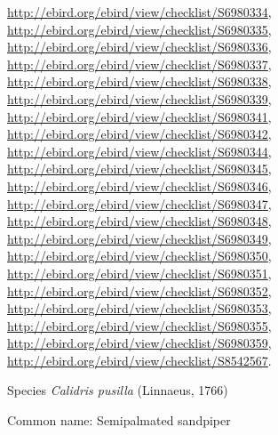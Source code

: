 \documentclass[9pt, article]{memoir}
\begin{document}
\begin{multicols}{2}
\url{http://ebird.org/ebird/view/checklist/S6980334}, 
\url{http://ebird.org/ebird/view/checklist/S6980335}, 
\url{http://ebird.org/ebird/view/checklist/S6980336}, 
\url{http://ebird.org/ebird/view/checklist/S6980337}, 
\url{http://ebird.org/ebird/view/checklist/S6980338}, 
\url{http://ebird.org/ebird/view/checklist/S6980339}, 
\url{http://ebird.org/ebird/view/checklist/S6980341}, 
\url{http://ebird.org/ebird/view/checklist/S6980342}, 
\url{http://ebird.org/ebird/view/checklist/S6980344}, 
\url{http://ebird.org/ebird/view/checklist/S6980345}, 
\url{http://ebird.org/ebird/view/checklist/S6980346}, 
\url{http://ebird.org/ebird/view/checklist/S6980347}, 
\url{http://ebird.org/ebird/view/checklist/S6980348}, 
\url{http://ebird.org/ebird/view/checklist/S6980349}, 
\url{http://ebird.org/ebird/view/checklist/S6980350}, 
\url{http://ebird.org/ebird/view/checklist/S6980351}, 
\url{http://ebird.org/ebird/view/checklist/S6980352}, 
\url{http://ebird.org/ebird/view/checklist/S6980353}, 
\url{http://ebird.org/ebird/view/checklist/S6980355}, 
\url{http://ebird.org/ebird/view/checklist/S6980359}, 
\url{http://ebird.org/ebird/view/checklist/S8542567}.

\vspace{6pt}\noindent\hspace{36pt}Species \textit{Calidris pusilla} (Linnaeus, 1766)


Common name: Semipalmated sandpiper


\end{multicols}
\end{document}
